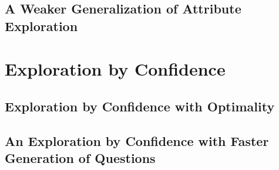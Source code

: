 \subsection{A Weaker Generalization of Attribute Exploration}
\label{sec:weak-gener-attr}


\section{Exploration by Confidence}
\label{sec:expl-conf}


\subsection{Exploration by Confidence with Optimality}
\label{sec:expl-conf-1}


\subsection{An Exploration by Confidence with Faster Generation of Questions}
\label{sec:poss-fast-expl}


